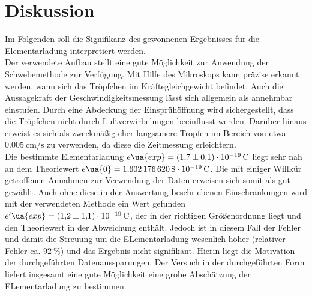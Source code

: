 \section{Diskussion}
Im Folgenden soll die Signifikanz des gewonnenen Ergebnisses für die Elementarladung interpretiert werden. \\
Der verwendete Aufbau stellt eine gute Möglichkeit zur Anwendung der Schwebemethode zur Verfügung. Mit Hilfe des Mikroskops
kann präzise erkannt werden, wann sich das Tröpfchen im Kräftegleichgewicht befindet. Auch die Aussagekraft der Geschwindigkeitsmessung lässt
sich allgemein als annehmbar einstufen. Durch eine Abdeckung der Einsprühöffnung wird sichergestellt, dass die
Tröpfchen nicht durch Luftverwirbelungen beeinflusst werden. Darüber hinaus erweist es sich als zweckmäßig eher langsamere Tropfen
im Bereich von etwa $\SI{0.005}{\centi\meter \per \second}$ zu verwenden, da diese die Zeitmessung erleichtern. \\
Die bestimmte Elementarladung $e\ua{exp} = \SI{+1.7(1)e-19}{\coulomb}$ liegt sehr nah an dem Theoriewert
$e\ua{0} = \SI{1.6021766208e-19}{\coulomb}$. Die mit einiger Willkür getroffenen Annahmen zur Verwendung der Daten erweisen sich
somit als gut gewählt. Auch ohne diese in der Auswertung beschriebenen Einschränkungen wird mit der verwendeten Methode ein Wert gefunden
$e'\ua{exp} = \SI{+1.2(11)e-19}{\coulomb}$, der in der richtigen Größenordnung liegt und den Theoriewert in der Abweichung enthält. Jedoch ist in
diesem Fall der Fehler und damit die Streuung um die ELementarladung wesenlich höher (relativer Fehler ca. $\SI{92}{\percent}$) und das Ergebnis
nicht signifikant. Hierin liegt die Motivation der durchgeführten Datenaussparungen.
Der Versuch in der durchgeführten Form liefert insgesamt eine gute Möglichkeit eine grobe Abschätzung der ELementarladung zu bestimmen.
